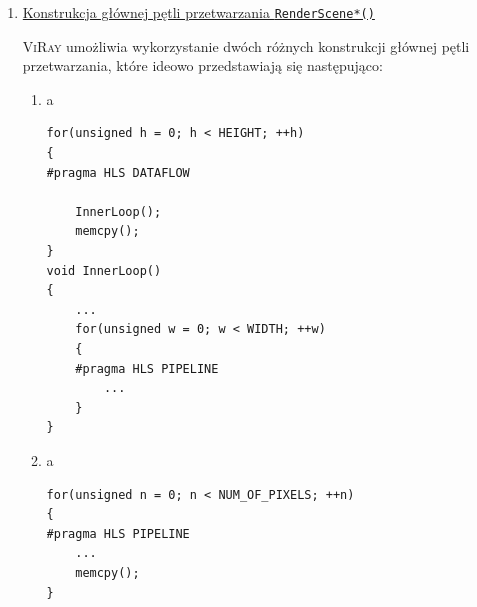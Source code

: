 \begin{enumerate}


\item \underline{Konstrukcja głównej pętli przetwarzania \texttt{RenderScene*()}}

\textsc{ViRay} umożliwia wykorzystanie dwóch różnych konstrukcji głównej pętli przetwarzania, które ideowo przedstawiają się następująco:
\begin{enumerate}
\item {\color{white}a}

\begin{lstlisting}
for(unsigned h = 0; h < HEIGHT; ++h)
{
#pragma HLS DATAFLOW
	
	InnerLoop();
	memcpy();
}
void InnerLoop()
{
	...
	for(unsigned w = 0; w < WIDTH; ++w)
	{
	#pragma HLS PIPELINE
		...
	}
}
\end{lstlisting}
\item {\color{white}a}
\begin{lstlisting}
for(unsigned n = 0; n < NUM_OF_PIXELS; ++n)
{
#pragma HLS PIPELINE
	...
	memcpy();
}
\end{lstlisting}


\end{enumerate}
\end{enumerate}
